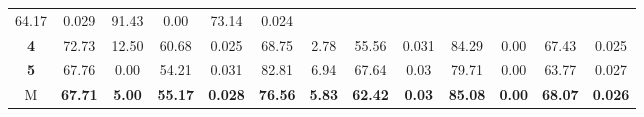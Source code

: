 \begin{table}[H]
\begin{tabular}{ccccccccccccc}
		\multicolumn{1}{c|}{64.17} &
		\multicolumn{1}{c|}{0.029} &
		\multicolumn{1}{c|}{91.43} &
		\multicolumn{1}{c|}{0.00} &
		\multicolumn{1}{c|}{73.14} &
		\multicolumn{1}{c|}{0.024} \\ \cline{2-13} 
		\multicolumn{1}{c|}{\cellcolor[HTML]{C0C0C0}\textbf{4}} &
		\multicolumn{1}{c|}{72.73} &
		\multicolumn{1}{c|}{12.50} &
		\multicolumn{1}{c|}{60.68} &
		\multicolumn{1}{c|}{0.025} &
		\multicolumn{1}{c|}{68.75} &
		\multicolumn{1}{c|}{2.78} &
		\multicolumn{1}{c|}{55.56} &
		\multicolumn{1}{c|}{0.031} &
		\multicolumn{1}{c|}{84.29} &
		\multicolumn{1}{c|}{0.00} &
		\multicolumn{1}{c|}{67.43} &
		\multicolumn{1}{c|}{0.025} \\ \cline{2-13} 
		\multicolumn{1}{c|}{\cellcolor[HTML]{C0C0C0}\textbf{5}} &
		\multicolumn{1}{c|}{67.76} &
		\multicolumn{1}{c|}{0.00} &
		\multicolumn{1}{c|}{54.21} &
		\multicolumn{1}{c|}{0.031} &
		\multicolumn{1}{c|}{82.81} &
		\multicolumn{1}{c|}{6.94} &
		\multicolumn{1}{c|}{67.64} &
		\multicolumn{1}{c|}{0.03} &
		\multicolumn{1}{c|}{79.71} &
		\multicolumn{1}{c|}{0.00} &
		\multicolumn{1}{c|}{63.77} &
		\multicolumn{1}{c|}{0.027} \\ \cline{2-13} 
		\multicolumn{1}{c|}{\cellcolor[HTML]{FFFE65}M} &
		\multicolumn{1}{c|}{\textbf{67.71}} &
		\multicolumn{1}{c|}{\textbf{5.00}} &
		\multicolumn{1}{c|}{\textbf{55.17}} &
		\multicolumn{1}{c|}{\textbf{0.028}} &
		\multicolumn{1}{c|}{\textbf{76.56}} &
		\multicolumn{1}{c|}{\textbf{5.83}} &
		\multicolumn{1}{c|}{\textbf{62.42}} &
		\multicolumn{1}{c|}{\textbf{0.03}} &
		\multicolumn{1}{c|}{\textbf{85.08}} &
		\multicolumn{1}{c|}{\textbf{0.00}} &
		\multicolumn{1}{c|}{\textbf{68.07}} &
		\multicolumn{1}{c|}{\textbf{0.026}} \\ \cline{2-13} 
	\end{tabular}
\end{table}